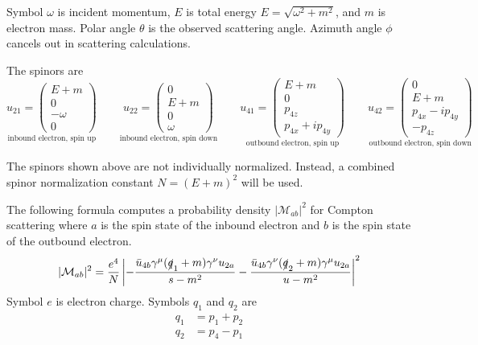 \documentclass[12pt]{article}
\begin{document}
\noindent
Symbol $\omega$ is incident momentum,
$E$ is total energy $E=\sqrt{\omega^2+m^2}$,
and $m$ is electron mass.
Polar angle $\theta$ is the observed scattering angle.
Azimuth angle $\phi$ cancels out in scattering calculations.

\bigskip
\noindent
The spinors are
\begin{equation*}
\underset{\text{inbound electron, spin up}}
{
u_{21}=\begin{pmatrix}
E+m\\
0\\
-\omega\\
0
\end{pmatrix}
}
\qquad
\underset{\text{inbound electron, spin down}}
{
u_{22}=\begin{pmatrix}
0\\
E+m\\
0\\
\omega
\end{pmatrix}
}
\qquad
\underset{\text{outbound electron, spin up}}
{
u_{41}=\begin{pmatrix}
E+m\\
0\\
p_{4z}\\
p_{4x}+ip_{4y}
\end{pmatrix}
}
\qquad
\underset{\text{outbound electron, spin down}}
{
u_{42}=\begin{pmatrix}
0\\
E+m\\
p_{4x}-ip_{4y}\\
-p_{4z}
\end{pmatrix}
}
\end{equation*}

\noindent
The spinors shown above are not individually normalized.
Instead, a combined spinor normalization constant $N=(E+m)^2$ will be used.

\bigskip
\noindent
The following formula computes a probability density $|\mathcal{M}_{ab}|^2$
for Compton scattering where $a$ is the spin state of the inbound electron
and $b$ is the spin state of the outbound electron.
\begin{equation*}
|\mathcal{M}_{ab}|^2
=
\frac{e^4}{N}
\left|
-\frac{\bar{u}_{4b}\gamma^\mu(\slashed{q}_1+m)\gamma^\nu u_{2a}}{s-m^2}
-\frac{\bar{u}_{4b}\gamma^\nu(\slashed{q}_2+m)\gamma^\mu u_{2a}}{u-m^2}
\right|^2
\end{equation*}
Symbol $e$ is electron charge.
Symbols $q_1$ and $q_2$ are
\begin{align*}
q_1&=p_1+p_2
\\
q_2&=p_4-p_1
\end{align*}
\end{document}
